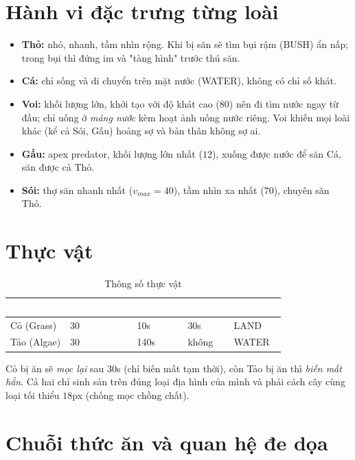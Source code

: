 \documentclass[12pt,a4paper]{report}
\newcommand{\keyword}[1]{\textcolor{primaryblue}{\textbf{#1}}}
\begin{document}
\section{Hành vi đặc trưng từng loài}

\begin{itemize}[leftmargin=1.5em]
    \item \keyword{Thỏ:} nhỏ, nhanh, tầm nhìn rộng. Khi bị săn sẽ tìm bụi rậm (BUSH) ẩn nấp; trong bụi thì đứng im và "tàng hình" trước thú săn.
    \item \keyword{Cá:} chỉ sống và di chuyển trên mặt nước (WATER), không có chỉ số khát.
    \item \keyword{Voi:} khối lượng lớn, khởi tạo với độ khát cao ($80$) nên đi tìm nước ngay từ đầu; chỉ uống ở \textit{máng nước} kèm hoạt ảnh uống nước riêng. Voi khiến mọi loài khác (kể cả Sói, Gấu) hoảng sợ và bản thân không sợ ai.
    \item \keyword{Gấu:} apex predator, khối lượng lớn nhất ($12$), xuống được nước để săn Cá, săn được cả Thỏ.
    \item \keyword{Sói:} thợ săn nhanh nhất ($v_{max}=40$), tầm nhìn xa nhất ($70$), chuyên săn Thỏ.
\end{itemize}

\section{Thực vật}

\begin{table}[H]
\centering
\caption{Thông số thực vật}
\begin{tabular}{L{2.5cm} C{2cm} C{2.5cm} C{2.5cm} L{2.5cm}}
\toprule
{}
\textcolor{white}{\textbf{Loại}} &
\textcolor{white}{\textbf{Dinh dưỡng}} &
\textcolor{white}{\textbf{Sinh sản}} &
\textcolor{white}{\textbf{Mọc lại}} &
\textcolor{white}{\textbf{Địa hình}} \\
\midrule
Cỏ (Grass) & 30 & 10s & 30s & LAND \\
 Tảo (Algae) & 30 & 140s & không & WATER \\
\bottomrule
\end{tabular}
\end{table}

Cỏ bị ăn sẽ \textit{mọc lại} sau $30$s (chỉ biến mất tạm thời), còn Tảo bị ăn thì \textit{biến mất hẳn}. Cả hai chỉ sinh sản trên đúng loại địa hình của mình và phải cách cây cùng loại tối thiểu $18$px (chống mọc chồng chất).

\section{Chuỗi thức ăn và quan hệ đe dọa}
\end{document}
